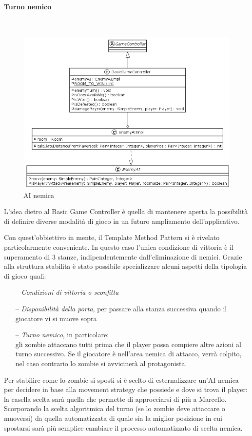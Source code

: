\documentclass[a4paper,titlepage,12pt]{article}
\begin{document}
\paragraph{Turno nemico}
\par \noindent \\
\begin{figure}[H]
    \centering
    \includegraphics[scale=0.5]{img/uml/EnemyAI.png}
    \caption{AI nemica}
    \label{fig: AI nemica}
\end{figure}
\par \noindent L'idea dietro al Basic Game Controller è quella di mantenere aperta la possibilità di definire diverse modalità di gioco in un futuro ampliamento dell'applicativo.
\par \noindent Con quest'obbiettivo in mente, il Template Method Pattern si è rivelato particolarmente conveniente. In questo caso l'unica condizione di vittoria è il superamento di 3 stanze, indipendentemente dall'eliminazione di nemici.
Grazie alla struttura stabilita è stato possibile specializzare alcuni aspetti della tipologia di gioco quali:
\begin{itemize}
    \item[--] \textit{Condizioni di vittoria o sconfitta}
    \item[--] \textit{Disponibilità della porta}, per passare alla stanza successiva quando il giocatore vi si muove sopra
    \item[--] \textit{Turno nemico}, in particolare:\\
		gli zombie attaccano tutti prima che il player possa compiere altre azioni al turno successivo. Se il giocatore è nell'area nemica di attacco, verrà colpito, nel caso contrario lo zombie si avvicinerà al protagonista.
\end{itemize}
\par \noindent Per stabilire come lo zombie si sposti si è scelto di esternalizzare un'AI nemica per decidere in base alla movement strategy che possiede e dove si trova il player: la casella scelta sarà quella che permette di approcciarsi di più a Marcello. Scorporando la scelta algoritmica del turno (se lo zombie deve attaccare o muoversi) da quella automatizzata di quale sia la miglior posizione in cui spostarsi sarà più semplice cambiare il processo automatizzato di scelta nemica.
\end{document}
